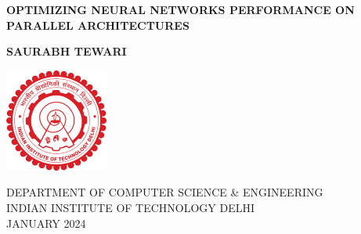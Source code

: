 \begin{titlepage}

\begin{center}


\LARGE 

\MakeUppercase{\textbf{OPTIMIZING NEURAL NETWORKS PERFORMANCE ON PARALLEL ARCHITECTURES}}\\

\vspace{3cm}

\LARGE

\textbf{SAURABH TEWARI} 

\vspace{6cm}
\hspace{0cm}
\hbox{\includegraphics[width=8pc]{ThesisSpecificPages/iitd-logo.pdf}}
\vspace{1cm}

\large{DEPARTMENT OF COMPUTER SCIENCE \& ENGINEERING}\\
\large{INDIAN INSTITUTE OF TECHNOLOGY DELHI}\\
\large{JANUARY 2024}\\

\end{center}

\end{titlepage}
